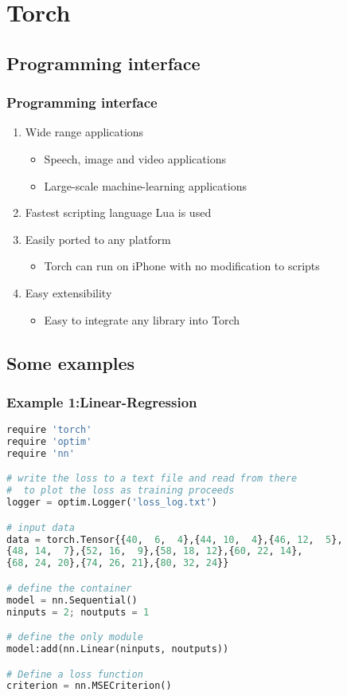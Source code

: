 
\section{Torch}\label{sec:Torch}

\subsection{Programming interface}

\begin{frame}
  \MyLogo
  \frametitle{Programming interface}  
\begin{enumerate}
\item Wide range applications
\begin{itemize}
\item Speech, image and video applications
\item  Large-scale machine-learning applications
\end{itemize}
\item Fastest scripting language Lua is used
\item Easily ported to any platform
\begin{itemize}
\item Torch can run on iPhone with no modification to scripts
\end{itemize}
\item Easy extensibility
\begin{itemize}
\item Easy to integrate any library into Torch
\end{itemize}
\end{enumerate}
\end{frame}

\subsection{Some examples}

\begin{frame}[fragile]
\MyLogo
\frametitle{Example 1:Linear-Regression}  
\scriptsize{
\begin{lstlisting}[language=python]
require 'torch'
require 'optim'
require 'nn'

# write the loss to a text file and read from there 
#  to plot the loss as training proceeds
logger = optim.Logger('loss_log.txt')

# input data 
data = torch.Tensor{{40,  6,  4},{44, 10,  4},{46, 12,  5},
{48, 14,  7},{52, 16,  9},{58, 18, 12},{60, 22, 14},
{68, 24, 20},{74, 26, 21},{80, 32, 24}}

# define the container
model = nn.Sequential()                 
ninputs = 2; noutputs = 1

# define the only module
model:add(nn.Linear(ninputs, noutputs)) 

# Define a loss function
criterion = nn.MSECriterion()
\end{lstlisting}
}
\end{frame}

